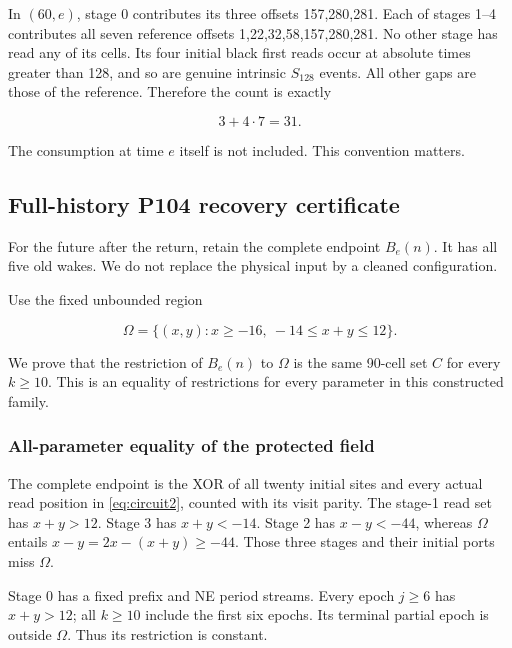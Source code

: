 \documentclass[
  11pt,
]{article}
\begin{document}
In \((60,e)\), stage 0 contributes its three offsets 157,280,281. Each of
stages 1--4 contributes all seven reference offsets
1,22,32,58,157,280,281. No other stage has read any of its cells. Its
four initial black first reads occur at absolute times greater than 128,
and so are genuine intrinsic $S_{128}$ events. All other gaps are those of
the reference. Therefore the count is exactly

\begin{equation}\label{eq:circuit4}
3+4\cdot7=31.
\end{equation}

The consumption at time \(e\) itself is not included. This convention
matters.

\subsection{Full-history P104 recovery
certificate}\label{circuit-4}

For the future after the return, retain the complete endpoint $B_e(n)$. It has all five old wakes. We do not
replace the physical input by a cleaned configuration.

Use the fixed unbounded region

\begin{equation}\label{eq:circuit5}
\Omega=\{(x,y):x\ge-16,\ -14\le x+y\le12\}.
\end{equation}

We prove that the restriction of $B_e(n)$ to \(\Omega\) is the same 90-cell
set \(C\) for every $k\ge10$. This is an equality of restrictions
for every parameter in this constructed family.

\subsubsection{All-parameter equality of the protected
field}\label{all-parameter-equality-of-the-protected-field}

The complete endpoint is the XOR of all twenty initial sites and every
actual read position in \eqref{eq:circuit2}, counted with its visit parity. The
stage-1 read set has $x+y>12$. Stage 3 has $x+y<-14$.
Stage 2 has $x-y<-44$, whereas \(\Omega\) entails
$x-y=2x-(x+y)\ge-44$. Those three stages and their initial ports
miss \(\Omega\).

Stage 0 has a fixed prefix and NE period streams. Every epoch
$j\ge6$ has $x+y>12$; all $k\ge10$ include the
first six epochs. Its terminal partial epoch is outside \(\Omega\). Thus its
restriction is constant.
\end{document}

